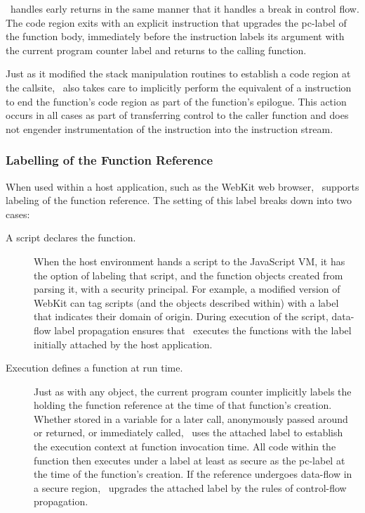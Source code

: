 \FlowCore\ handles early returns in the same manner that it handles a break in control flow.
The code region exits with an explicit \popj instruction that upgrades the pc-label of the function body, immediately before the  instruction labels its argument with the current program counter label and returns to the calling function.

Just as it modified the stack manipulation routines to establish a code region at the callsite, \FlowCore\ also takes care to implicitly perform the equivalent of a \popj instruction to end the function's code region as part of the function's epilogue.
This action occurs in all cases as part of transferring control to the caller function and does not engender instrumentation of the \popj instruction into the instruction stream.

\subsubsection{Labelling of the Function Reference}

When used within a host application, such as the WebKit web browser, \FlowCore\ supports labeling of the function reference.
The setting of this label breaks down into two cases:
\begin{description}
 \item [A script declares the function.]
  When the host environment hands a script to the JavaScript VM, it has the option of labeling that script, and the function objects created from parsing it, with a security principal.
  For example, a modified version of WebKit can tag scripts (and the objects described within) with a label that indicates their domain of origin.
  During execution of the script, data-flow label propagation ensures that \FlowCore\ executes the functions with the label initially attached by the host application.
 \item [Execution defines a function at run time.]
   Just as with any object, the current program counter implicitly labels the  holding the function reference at the time of that function's creation.
  Whether stored in a variable for a later call, anonymously passed around or returned, or immediately called, \FlowCore\ uses the attached label to establish the execution context at function invocation time.
  All code within the function then executes under a label at least as secure as the pc-label at the time of the function's creation.
  If the reference undergoes data-flow in a secure region, \FlowCore\ upgrades the attached label by the rules of control-flow propagation.
\end{description}


